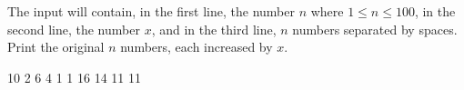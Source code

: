 




The input will contain, in the first line, the number $n$ where $1\leq n\leq 100$, in the second line, the number $x$, and in the third line, $n$ numbers separated by spaces. Print the original $n$ numbers, each increased by $x$.

10
2 6 4 1 1
 16 14 11 11
\koniec


